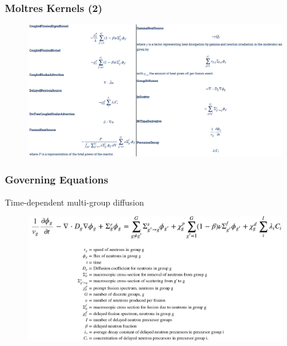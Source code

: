 \begin{frame}
  \frametitle{Moltres Kernels (2)}
               \begin{figure}[t]
               \vspace*{-0.1in}
                 \hspace*{-0.35in}
                \includegraphics[height=0.6\textwidth]{./images/kernels11.png}
               \end{figure}   
\end{frame}


\begin{frame}
  \frametitle{Governing Equations}
      \begin{block}{Time-dependent multi-group diffusion}
              \begin{figure}[t]
               \hspace*{-0.25in}
                \includegraphics[height=0.55\textwidth]{./images/diffusion.png}
               \end{figure}   
      \end{block}
\end{frame}


